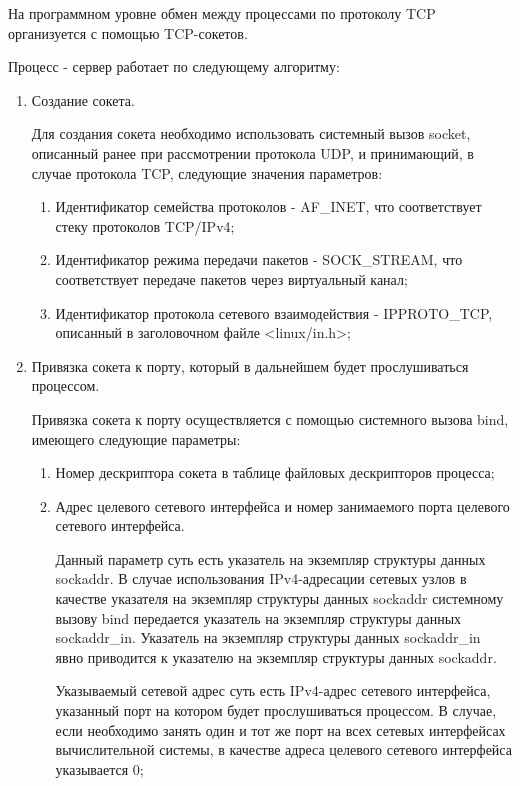 	На программном уровне обмен между процессами по протоколу TCP организуется с помощью TCP-сокетов.

	Процесс - сервер работает по следующему алгоритму:

	\begin{enumerate}

		\item Создание сокета.

			Для создания сокета необходимо использовать системный вызов socket, описанный ранее при рассмотрении протокола UDP, и принимающий,
			в случае протокола TCP, следующие значения параметров:

				\begin{enumerate}

					\item Идентификатор семейства протоколов - AF\_INET, что соответствует стеку протоколов TCP/IPv4;
					\item Идентификатор режима передачи пакетов - SOCK\_STREAM, что соответствует передаче пакетов через виртуальный канал;
					\item Идентификатор протокола сетевого взаимодействия - IPPROTO\_TCP, описанный в заголовочном файле <linux/in.h>;

				\end{enumerate}

		\item Привязка сокета к порту, который в дальнейшем будет прослушиваться процессом.

			Привязка сокета к порту осуществляется с помощью системного вызова bind, имеющего следующие параметры:

				\begin{enumerate}

					\item Номер дескриптора сокета в таблице файловых дескрипторов процесса;
					\item Адрес целевого сетевого интерфейса и номер занимаемого порта целевого сетевого интерфейса.

						Данный параметр суть есть указатель на экземпляр структуры данных sockaddr.
						В случае использования IPv4-адресации сетевых узлов в качестве указателя на экземпляр
						структуры данных sockaddr системному вызову bind передается указатель на экземпляр структуры данных sockaddr\_in.
						Указатель на экземпляр структуры данных sockaddr\_in явно приводится к указателю на экземпляр структуры данных sockaddr.

						Указываемый сетевой адрес суть есть IPv4-адрес сетевого интерфейса, указанный порт на котором будет прослушиваться процессом.
						В случае, если необходимо занять один и тот же порт на всех
						сетевых интерфейсах вычислительной системы, в качестве адреса целевого сетевого интерфейса указывается 0;


\end{enumerate}
\end{enumerate}
